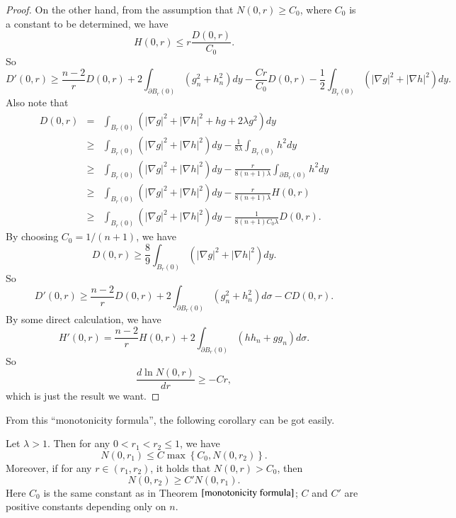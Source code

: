 \documentclass[a4paper, 12pt, onecolumn]{article} \textwidth 148mm
\begin{document}
\begin{proof}
On the other hand, from the assumption that $N(0,r)\geq C_0$, where $C_0$ is a constant to be determined, we have
\begin{equation*}
H(0,r)\leq r\frac{D(0,r)}{C_0}.
\end{equation*}
So
\begin{equation*}
D'(0,r)\geq\frac{n-2}{r}D(0,r)+2\int_{\partial B_r(0)}\left(g_n^2+h_n^2\right)dy-\frac{Cr}{C_0}D(0,r)-\frac{1}{2}\int_{B_r(0)}\left(|\nabla g|^2+|\nabla h|^2\right)dy.
\end{equation*}
Also note that
\begin{eqnarray*}
D(0,r)&=&\int_{B_r(0)}\left(|\nabla g|^2+|\nabla h|^2+hg+2\lambda g^2\right)dy
\\&\geq&\int_{B_r(0)}\left(|\nabla g|^2+|\nabla h|^2\right)dy-\frac{1}{8\lambda}\int_{B_r(0)}h^2dy
\\&\geq&\int_{B_r(0)}\left(|\nabla g|^2+|\nabla h|^2\right)dy-\frac{r}{8(n+1)\lambda}\int_{\partial B_r(0)}h^2dy
\\&\geq&\int_{B_r(0)}\left(|\nabla g|^2+|\nabla h|^2\right)dy-\frac{r}{8(n+1)\lambda}H(0,r)
\\&\geq&\int_{B_r(0)}\left(|\nabla g|^2+|\nabla h|^2\right)dy-\frac{1}{8(n+1)C_0\lambda}D(0,r).
\end{eqnarray*}
By choosing $C_0=1/(n+1)$, we have
\begin{equation*}
D(0,r)\geq\frac{8}{9}\int_{B_r(0)}\left(|\nabla g|^2+|\nabla h|^2\right)dy.
\end{equation*}
So
\begin{equation*}
D'(0,r)\geq\frac{n-2}{r}D(0,r)+2\int_{\partial B_r(0)}\left(g_n^2+h_n^2\right)d\sigma-CD(0,r).
\end{equation*}
By some direct calculation, we have
\begin{equation*}
H'(0,r)=\frac{n-2}{r}H(0,r)+2\int_{\partial B_r(0)}\left(hh_n+gg_n\right)d\sigma.
\end{equation*}
So
\begin{equation*}
\frac{d\ln N(0,r)}{dr}\geq-Cr,
\end{equation*}
which is just the result we want.
\end{proof}

From this ``monotonicity formula'', the following corollary can be got easily.

\begin{corollary}\label{frequency control}
Let $\lambda>1$. Then for any $0<r_1<r_2\leq 1$, we have
\begin{equation}\label{frequency control_big radius control small radius}
N(0,r_1)\leq C\max\left\{C_0, N(0,r_2)\right\}.
\end{equation}
Moreover, if for any $r\in(r_1,r_2)$, it holds that $N(0,r)>C_0$, then
\begin{equation}\label{frequency control_small radius control big radius}
N(0,r_2)\geq C'N(0,r_1).
\end{equation}
Here $C_0$ is the same constant as in Theorem $\ref{monotonicity formula}$; $C$ and $C'$ are positive constants depending only on $n$.
\end{corollary}
\end{document}
